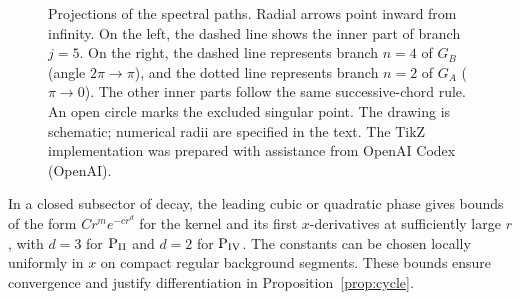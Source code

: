 \begin{figure}[htbp]
\centering
{}
\caption{Projections of the spectral paths. Radial arrows point inward
from infinity. On the left, the dashed line shows the inner part of
branch $j=5$. On the right, the dashed line represents branch $n=4$
of $G_B$ (angle $2\pi\to\pi$), and the dotted line represents branch
$n=2$ of $G_A$ ($\pi\to0$). The other inner parts follow the same
successive-chord rule. An open circle marks the excluded singular point.
The drawing is schematic; numerical radii are specified in the text.
The TikZ implementation was prepared with assistance from OpenAI Codex
(OpenAI).}
\label{fig:contours}
\end{figure}

In a closed subsector of decay, the leading cubic or quadratic phase
gives bounds of the form $C r^m e^{-c r^d}$ for the kernel and its first
$x$-derivatives at sufficiently large $r$, with $d=3$ for $\mathrm{P}_{\mathrm{II}}$ and
$d=2$ for $\mathrm{P}_{\mathrm{IV}}$. The constants can be chosen locally uniformly in $x$
on compact regular background segments. These bounds ensure convergence
and justify differentiation in Proposition~\ref{prop:cycle}.


